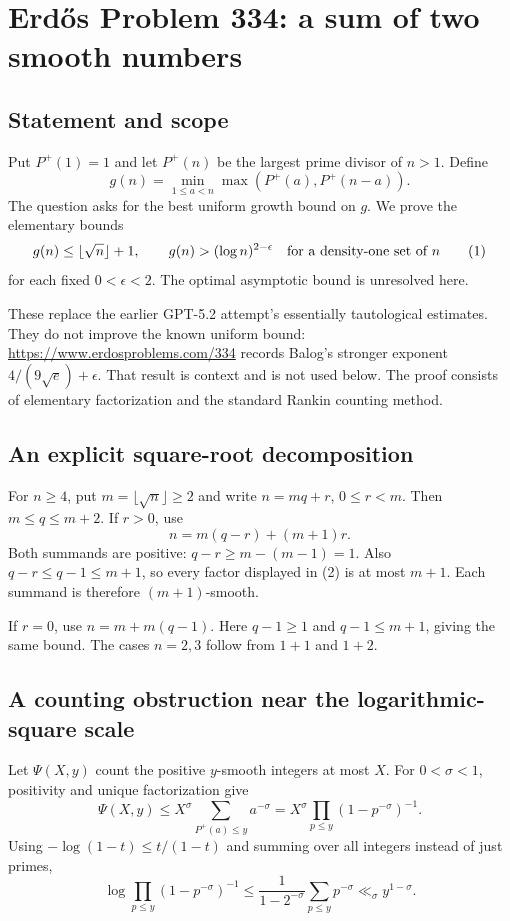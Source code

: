 \section*{Erd\H{o}s Problem 334: a sum of two smooth numbers}
\subsection*{Statement and scope}
Put $P^+(1)=1$ and let $P^+(n)$ be the largest prime divisor of $n>1$. Define
\[
 g(n)=\min_{1\le a<n}\max(P^+(a),P^+(n-a)).
\]
The question asks for the best uniform growth bound on $g$. We prove the elementary bounds
\[
 g(n)\le\lfloor\sqrt n\rfloor+1,\qquad
 g(n)>(\log n)^{2-\epsilon}\quad\hbox{for a density-one set of }n
 \tag{1}
\]
for each fixed $0<\epsilon<2$. The optimal asymptotic bound is unresolved here.

These replace the earlier GPT-5.2 attempt's essentially tautological estimates. They do not improve the known uniform bound: \url{https://www.erdosproblems.com/334} records Balog's stronger exponent $4/(9\sqrt e)+\epsilon$. That result is context and is not used below. The proof consists of elementary factorization and the standard Rankin counting method.

\subsection*{An explicit square-root decomposition}
For $n\ge4$, put $m=\lfloor\sqrt n\rfloor\ge2$ and write $n=mq+r$, $0\le r<m$. Then $m\le q\le m+2$. If $r>0$, use
\[
 n=m(q-r)+(m+1)r. \tag{2}
\]
Both summands are positive: $q-r\ge m-(m-1)=1$. Also $q-r\le q-1\le m+1$, so every factor displayed in (2) is at most $m+1$. Each summand is therefore $(m+1)$-smooth.

If $r=0$, use $n=m+m(q-1)$. Here $q-1\ge1$ and $q-1\le m+1$, giving the same bound. The cases $n=2,3$ follow from $1+1$ and $1+2$.

\subsection*{A counting obstruction near the logarithmic-square scale}
Let $\Psi(X,y)$ count the positive $y$-smooth integers at most $X$. For $0<\sigma<1$, positivity and unique factorization give
\[
 \Psi(X,y)
 \le X^\sigma\sum_{P^+(a)\le y}a^{-\sigma}
 =X^\sigma\prod_{p\le y}(1-p^{-\sigma})^{-1}.
\]
Using $-\log(1-t)\le t/(1-t)$ and summing over all integers instead of just primes,
\[
 \log\prod_{p\le y}(1-p^{-\sigma})^{-1}
 \le\frac1{1-2^{-\sigma}}\sum_{p\le y}p^{-\sigma}
 \ll_\sigma y^{1-\sigma}. \tag{3}
\]

